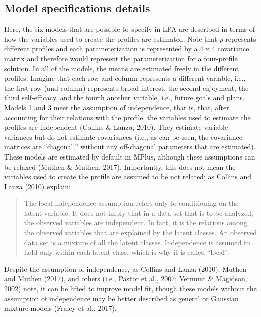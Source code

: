 \documentclass[]{msu-thesis}
\theoremstyle{definition}
\theoremstyle{definition}
\theoremstyle{definition}
\theoremstyle{remark}
\begin{document}
\subsection{Model specifications
details}\label{model-specifications-details}

Here, the six models that are possible to specify in LPA are described
in terms of how the variables used to create the profiles are estimated.
Note that \emph{p} represents different profiles and each
parameterization is represented by a 4 x 4 covariance matrix and
therefore would represent the parameterization for a four-profile
solution. In all of the models, the means are estimated freely in the
different profiles. Imagine that each row and column represents a
different variable, i.e., the first row (and column) represents broad
interest, the second enjoyment, the third self-efficacy, and the fourth
another variable, i.e., future goals and plans. Models 1 and 3 meet the
assumption of independence, that is, that, after accounting for their
relations with the profile, the variables used to estimate the profiles
are independent (Collins \& Lanza, 2010). They estimate variable
variances but do not estimate covariances (i.e., as can be seen, the
covariance matrices are ``diagonal,'' without any off-diagonal
parameters that are estimated). These models are estimated by default in
MPlus, although these assumptions can be relaxed (Muthen \& Muthen,
2017). Importantly, this does not mean the variables used to create the
profile are assumed to be not related; as Collins and Lanza (2010)
explain:

\begin{quote}
The local independence assumption refers only to conditioning on the
latent variable. It does not imply that in a data set that is to be
analyzed, the observed variables are independent. In fact, it is the
relations among the observed variables that are explained by the latent
classes. An observed data set is a mixture of all the latent classes.
Independence is assumed to hold only within each latent class, which is
why it is called ``local''.
\end{quote}

Despite the assumption of independence, as Collins and Lanza (2010),
Muthen and Muthen (2017), and others (i.e., Pastor et al., 2007; Vermunt
\& Magidson, 2002) note, it can be lifted to improve model fit, though
these models without the assumption of independence may be better
described as general or Gaussian mixture models (Fraley et al., 2017).
\end{document}
